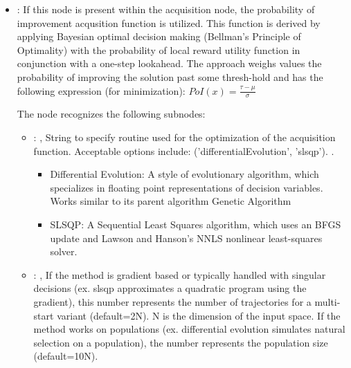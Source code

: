 \begin{itemize}
\begin{itemize}
        \item {}:
          If this node is present within the acquisition node,                         the
          probability of improvement acqusition function is utilized.                         This
          function is derived by applying Bayesian optimal decision making (Bellman's Principle of
          Optimality)                         with the probability of local reward utility function
          in conjunction with a one-step lookahead.                         The approach weighs
          values the probability of improving the solution past some thresh-hold and has the
          following expression (for minimization):                         $PoI(x) = \frac{\tau -
          \mu}{\sigma}$

          The  node recognizes the following subnodes:
          \begin{itemize}
            \item {}: ,
              String to specify routine used for the optimization of the acquisition function.
              Acceptable options include: ('differentialEvolution', 'slsqp').
              .
              \begin{itemize}                                                  \item Differential
              Evolution: A style of evolutionary algorithm, which specializes in floating point
              representations of decision variables. Works similar to its parent algorithm Genetic
              Algorithm                                                  \item SLSQP: A Sequential
              Least Squares algorithm, which uses an BFGS update and
              Lawson and Hanson’s NNLS nonlinear least-squares solver.
              \end{itemize}

            \item {}: ,
              If the method is gradient based or typically handled with singular
              decisions (ex. slsqp approximates a quadratic program using the gradient), this number
              represents the number of trajectories for a multi-start variant (default=2N).
              N is the dimension of the input space.
              If the method works on populations (ex. differential evolution simulates
              natural selection on a population),
              the number represents the population size (default=10N).


\end{itemize}
\end{itemize}
\end{itemize}
